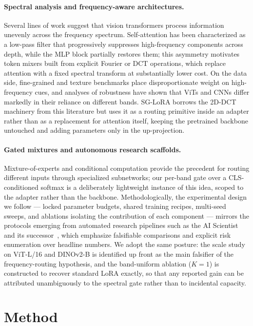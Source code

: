 \documentclass{article}
\begin{document}
\paragraph{Spectral analysis and frequency-aware architectures.}
Several lines of work suggest that vision transformers process information unevenly across the frequency spectrum. Self-attention has been characterized as a low-pass filter that progressively suppresses high-frequency components across depth, while the MLP block partially restores them; this asymmetry motivates token mixers built from explicit Fourier or DCT operations, which replace attention with a fixed spectral transform at substantially lower cost. On the data side, fine-grained and texture benchmarks place disproportionate weight on high-frequency cues, and analyses of robustness have shown that ViTs and CNNs differ markedly in their reliance on different bands. SG-LoRA borrows the 2D-DCT machinery from this literature but uses it as a routing primitive inside an adapter rather than as a replacement for attention itself, keeping the pretrained backbone untouched and adding parameters only in the up-projection.

\paragraph{Gated mixtures and autonomous research scaffolds.}
Mixture-of-experts and conditional computation provide the precedent for routing different inputs through specialized subnetworks; our per-band gate over a CLS-conditioned softmax is a deliberately lightweight instance of this idea, scoped to the adapter rather than the backbone. Methodologically, the experimental design we follow --- locked parameter budgets, shared training recipes, multi-seed sweeps, and ablations isolating the contribution of each component --- mirrors the protocols emerging from automated research pipelines such as the AI Scientist~\citep{lu2024aiscientist} and its successor~\citep{yamada2025aiscientistv2}, which emphasize falsifiable comparisons and explicit risk enumeration over headline numbers. We adopt the same posture: the scale study on ViT-L/16 and DINOv2-B is identified up front as the main falsifier of the frequency-routing hypothesis, and the band-uniform ablation ($K=1$) is constructed to recover standard LoRA exactly, so that any reported gain can be attributed unambiguously to the spectral gate rather than to incidental capacity.

\section{Method}
\end{document}

